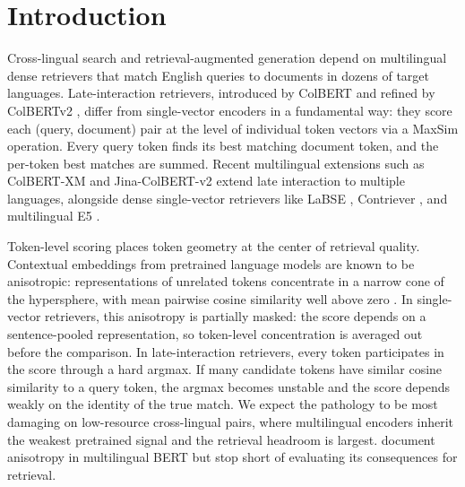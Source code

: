 \section{Introduction}
\label{sec:intro}

Cross-lingual search and retrieval-augmented generation depend on multilingual dense retrievers that match English queries to documents in dozens of target languages. Late-interaction retrievers, introduced by ColBERT \citep{khattab2020colbert} and refined by ColBERTv2 \citep{santhanam2022colbertv2}, differ from single-vector encoders in a fundamental way: they score each (query, document) pair at the level of individual token vectors via a MaxSim operation. Every query token finds its best matching document token, and the per-token best matches are summed. Recent multilingual extensions such as ColBERT-XM \citep{louis2024colbertxm} and Jina-ColBERT-v2 \citep{jha2024jinacolbert} extend late interaction to multiple languages, alongside dense single-vector retrievers like LaBSE \citep{feng2022labse}, Contriever \citep{izacard2022contriever}, and multilingual E5 \citep{wang2024me5}.

Token-level scoring places token geometry at the center of retrieval quality. Contextual embeddings from pretrained language models are known to be anisotropic: representations of unrelated tokens concentrate in a narrow cone of the hypersphere, with mean pairwise cosine similarity well above zero \citep{ethayarajh2019contextual,mu2018allbutthetop,gao2019representation}. In single-vector retrievers, this anisotropy is partially masked: the score depends on a sentence-pooled representation, so token-level concentration is averaged out before the comparison. In late-interaction retrievers, every token participates in the score through a hard argmax. If many candidate tokens have similar cosine similarity to a query token, the argmax becomes unstable and the score depends weakly on the identity of the true match. We expect the pathology to be most damaging on low-resource cross-lingual pairs, where multilingual encoders inherit the weakest pretrained signal and the retrieval headroom is largest. \citet{rajaee2022isotropy} document anisotropy in multilingual BERT but stop short of evaluating its consequences for retrieval.

